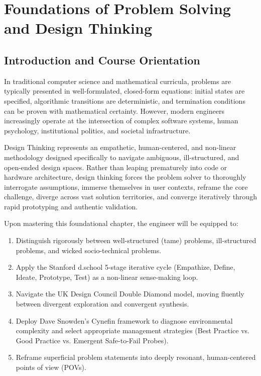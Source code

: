 \chapter{Foundations of Problem Solving and Design Thinking}
\label{chap:foundations}

\section{Introduction and Course Orientation}
In traditional computer science and mathematical curricula, problems are typically presented in well-formulated, closed-form equations: initial states are specified, algorithmic transitions are deterministic, and termination conditions can be proven with mathematical certainty. However, modern engineers increasingly operate at the intersection of complex software systems, human psychology, institutional politics, and societal infrastructure. 

Design Thinking represents an empathetic, human-centered, and non-linear methodology designed specifically to navigate ambiguous, ill-structured, and open-ended design spaces. Rather than leaping prematurely into code or hardware architecture, design thinking forces the problem solver to thoroughly interrogate assumptions, immerse themselves in user contexts, reframe the core challenge, diverge across vast solution territories, and converge iteratively through rapid prototyping and authentic validation.

\begin{important}
Upon mastering this foundational chapter, the engineer will be equipped to:
\begin{enumerate}[leftmargin=1.5em]
    \item Distinguish rigorously between well-structured (tame) problems, ill-structured problems, and wicked socio-technical problems.
    \item Apply the Stanford d.school 5-stage iterative cycle (Empathize, Define, Ideate, Prototype, Test) as a non-linear sense-making loop.
    \item Navigate the UK Design Council Double Diamond model, moving fluently between divergent exploration and convergent synthesis.
    \item Deploy Dave Snowden's Cynefin framework to diagnose environmental complexity and select appropriate management strategies (Best Practice vs. Good Practice vs. Emergent Safe-to-Fail Probes).
    \item Reframe superficial problem statements into deeply resonant, human-centered points of view (POVs).
\end{enumerate}
\end{important}

